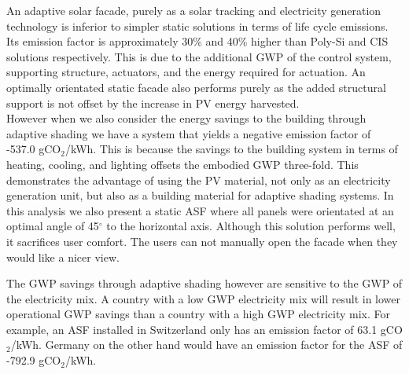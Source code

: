 
An adaptive solar facade, purely as a solar tracking and electricity generation technology is inferior to simpler static solutions in terms of life cycle emissions. Its emission factor is approximately 30\% and 40\% higher than Poly-Si and CIS solutions respectively. This is due to the additional GWP of the control system, supporting structure, actuators, and the energy required for actuation. An optimally orientated static facade also performs purely as the added structural support is not offset by the increase in PV energy harvested. \\

However when we also consider the energy savings to the building through adaptive shading we have a system that yields a negative emission factor of -537.0 gCO${_2}$/kWh. This is because the savings to the building system in terms of heating, cooling, and lighting offsets the embodied GWP three-fold. This demonstrates the advantage of using the PV material, not only as an electricity generation unit, but also as a building material for adaptive shading systems. In this analysis we also present a static ASF where all panels were orientated at an optimal angle of 45$^{\circ}$ to the horizontal axis. Although this solution performs well, it sacrifices user comfort. The users can not manually open the facade when they would like a nicer view.


The GWP savings through adaptive shading however are sensitive to the GWP of the electricity mix. A country with a low GWP electricity mix will result in lower operational GWP savings than a country with a high GWP electricity mix. For example, an ASF installed in Switzerland only has an emission factor of 63.1 gCO${_2}$/kWh. Germany on the other hand would have an emission factor for the ASF of -792.9  gCO${_2}$/kWh.\\

